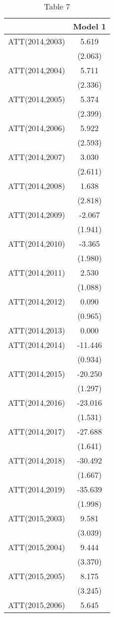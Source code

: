 \begin{table}

\caption{Table 7}
\centering
\begin{tabular}[t]{lc}
\toprule
  & Model 1\\
\midrule
ATT(2014,2003) & 5.619\\
 & (2.063)\\
ATT(2014,2004) & 5.711\\
 & (2.336)\\
ATT(2014,2005) & 5.374\\
 & (2.399)\\
ATT(2014,2006) & 5.922\\
 & (2.593)\\
ATT(2014,2007) & 3.030\\
 & (2.611)\\
ATT(2014,2008) & 1.638\\
 & (2.818)\\
ATT(2014,2009) & -2.067\\
 & (1.941)\\
ATT(2014,2010) & -3.365\\
 & (1.980)\\
ATT(2014,2011) & 2.530\\
 & (1.088)\\
ATT(2014,2012) & 0.090\\
 & (0.965)\\
ATT(2014,2013) & 0.000\\
ATT(2014,2014) & -11.446\\
 & (0.934)\\
ATT(2014,2015) & -20.250\\
 & (1.297)\\
ATT(2014,2016) & -23.016\\
 & (1.531)\\
ATT(2014,2017) & -27.688\\
 & (1.641)\\
ATT(2014,2018) & -30.492\\
 & (1.667)\\
ATT(2014,2019) & -35.639\\
 & (1.998)\\
ATT(2015,2003) & 9.581\\
 & (3.039)\\
ATT(2015,2004) & 9.444\\
 & (3.370)\\
ATT(2015,2005) & 8.175\\
 & (3.245)\\
ATT(2015,2006) & 5.645\\

\end{tabular}
\end{table}
